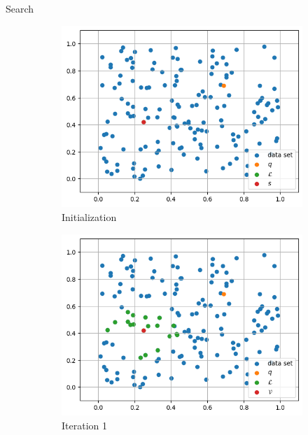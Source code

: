 {Search}
    \begin{figure}[h]
        \centering
        \hfill
        \begin{subfigure}{0.31\textwidth}
            \includegraphics[width=\textwidth]{images/greedy-search-begin}
            \caption{Initialization}
        \end{subfigure}
        \hfill
        \begin{subfigure}{0.31\textwidth}
            \includegraphics[width=\textwidth]{images/greedy-search-1}
            \caption{Iteration 1}
        \end{subfigure}
        \hfill
        \begin{subfigure}{0.31\textwidth}

\end{subfigure}
\end{figure}
